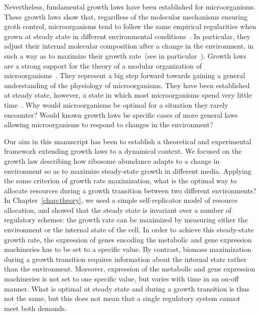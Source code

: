 Nevertheless, fundamental growth laws have been established for microorganisms.
These growth laws show that, regardless of the molecular mechanisms ensuring groth control, microorganisms tend to follow the same empirical regularities when grown at steady state in different environmental conditions~\cite{molenaar_shifts_2009,scott_emergence_2014,scott_interdependence_2010,scott_bacterial_2011}.
In particular, they adjust their internal molecular composition after a change in the environment, in such a way as to maximize their growth rate~(see in particular~\cite{molenaar_shifts_2009,scott_emergence_2014}).
Growth laws are a strong support for the theory of a modular organization of microorganisms~\cite{scott_emergence_2014,hartwell_molecular_1999,arkin_fast_2006,guido_bottom-up_2006}.
They represent a big step forward towards gaining a general understanding of the physiology of microorganisms.
They have been established at steady state, however, a state in which most microorganisms spend very little time~\cite{mcarthur_microbial_2006,menge_nitrogen_2012,
hobbie_microbes_2013,savageau_escherichia_1983,
savageau_demand_1998,blount_unexhausted_2015,vanelsas_survival_2011}.
Why would microorganisms be optimal for a situation they rarely encounter?
Would known growth laws be specific cases of more general laws allowing microorganisms to respond to changes in the environment?

Our aim in this manuscript has been to establish a theoretical and experimental framework extending growth laws to a dynamical context.
We focused on the growth law describing how ribosome abundance adapts to a change in environment so as to maximize steady-state growth in different media.
Applying the same criterion of growth rate maximization, what is the optimal way to allocate resources during a growth transition between two different environments?
In Chapter~\ref{chap:theory}, we used a simple self-replicator model of resource allocation, and showed that the steady state is invariant over a number of regulatory schemes: the growth rate can be maximized by measuring either the environment or the internal state of the cell.
In order to achieve this steady-state growth rate, the expression of genes encoding the metabolic and gene expression machineries has to be set to a specific value.
By contrast, biomass maximization during a growth transition requires information about the internal state rather than the environment.
Moreover, expression of the metabolic and gene expression machineries is not set to one specific value, but varies with time in an on-off manner.
What is optimal at steady state and during a growth transition is thus not the same, but this does not mean that a single regulatory system cannot meet both demands.

